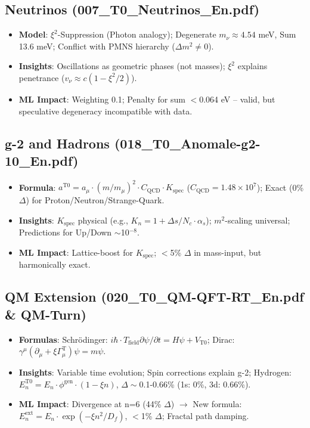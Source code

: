 	\subsection{Neutrinos (007\_T0\_Neutrinos\_En.pdf)}
	
	\begin{itemize}
		\item \textbf{Model}: $\xi^2$-Suppression (Photon analogy); Degenerate $m_\nu \approx 4.54$ meV, Sum 13.6 meV; Conflict with PMNS hierarchy ($\Delta m^2 \neq 0$).
		\item \textbf{Insights}: Oscillations as geometric phases (not masses); $\xi^2$ explains penetrance ($v_\nu \approx c (1 - \xi^2/2)$).
		\item \textbf{ML Impact}: Weighting 0.1; Penalty for sum $<$0.064 eV – valid, but speculative degeneracy incompatible with data.
	\end{itemize}
	
	\subsection{g-2 and Hadrons (018\_T0\_Anomale-g2-10\_En.pdf)}
	
	\begin{itemize}
		\item \textbf{Formula}: $a^{\text{T0}} = a_\mu \cdot (m/m_\mu)^2 \cdot C_\text{QCD} \cdot K_\text{spec}$ ($C_\text{QCD}=1.48\times10^7$); Exact (0\% $\Delta$) for Proton/Neutron/Strange-Quark.
		\item \textbf{Insights}: $K_\text{spec}$ physical (e.g., $K_n = 1 + \Delta s/N_c \cdot \alpha_s$); $m^2$-scaling universal; Predictions for Up/Down $\sim$10$^{-8}$.
		\item \textbf{ML Impact}: Lattice-boost for $K_\text{spec}$; $<$5\% $\Delta$ in mass-input, but harmonically exact.
	\end{itemize}
	
	\subsection{QM Extension (020\_T0\_QM-QFT-RT\_En.pdf \& QM-Turn)}
	
	\begin{itemize}
		\item \textbf{Formulas}: Schrödinger: $i\hbar \cdot T_\text{field} \partial\psi/\partial t = H \psi + V_\text{T0}$; Dirac: $\gamma^\mu (\partial_\mu + \xi \Gamma_\mu^\text{T}) \psi = m \psi$.
		\item \textbf{Insights}: Variable time evolution; Spin corrections explain g-2; Hydrogen: $E_n^{\text{T0}} = E_n \cdot \phi^\text{gen} \cdot (1 - \xi n)$, $\Delta\sim$0.1-0.66\% (1s: 0\%, 3d: 0.66\%).
		\item \textbf{ML Impact}: Divergence at n=6 (44\% $\Delta$) $\to$ New formula: $E_n^\text{ext} = E_n \cdot \exp(-\xi n^2 / D_f)$, $<$1\% $\Delta$; Fractal path damping.
	\end{itemize}
	

